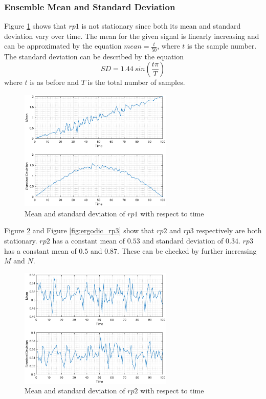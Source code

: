 \documentclass{article}
\begin{document}
\pagebreak

\subsubsection{Ensemble Mean and Standard Deviation}

Figure \ref{fig:ergodic_rp1} shows that $rp1$ is not stationary since both its mean and standard deviation vary over time. The mean for the given signal is linearly increasing and can be approximated by the equation $mean = \frac{t}{50}$, where $t$ is the sample number. The standard deviation can be described by the equation $$ SD = 1.44 \ sin(\frac{t\pi}{T})$$ where $t$ is as before and $T$ is the total number of samples.\\

\begin{figure}[h!]
\centering
\includegraphics[width=0.65\textwidth]{ergodic_rp1}
\caption{\label{fig:ergodic_rp1} Mean and standard deviation of $rp1$ with respect to time}
\end{figure}

Figure \ref{fig:ergodic_rp2} and Figure \ref{fig:ergodic_rp3} show that $rp2$ and $rp3$ respectively are both stationary. $rp2$ has a constant mean of $0.53$ and standard deviation of $0.34$. $rp3$ has a constant mean of $0.5$ and $0.87$. These can be checked by further increasing $M$ and $N$.

\begin{figure}[h!]
\centering
\includegraphics[width=0.65\textwidth]{ergodic_rp2}
\caption{\label{fig:ergodic_rp2} Mean and standard deviation of $rp2$ with respect to time}
\end{figure}
\end{document}
